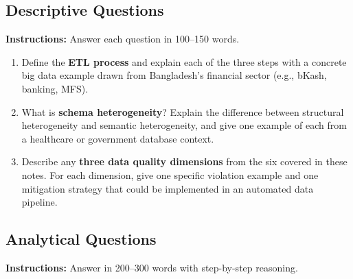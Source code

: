 \documentclass[12pt,a4paper]{article}
\begin{document}
\subsection*{Descriptive Questions}
\noindent\textbf{Instructions:} Answer each question in 100--150 words.

\begin{enumerate}[label=\textbf{D\arabic*.}, leftmargin=2.5em, itemsep=8pt]
  \item Define the \textbf{ETL process} and explain each of the three steps with a concrete big data example drawn from Bangladesh's financial sector (e.g., bKash, banking, MFS).
  \item What is \textbf{schema heterogeneity}?  Explain the difference between structural heterogeneity and semantic heterogeneity, and give one example of each from a healthcare or government database context.
  \item Describe any \textbf{three data quality dimensions} from the six covered in these notes.  For each dimension, give one specific violation example and one mitigation strategy that could be implemented in an automated data pipeline.
\end{enumerate}

\subsection*{Analytical Questions}
\noindent\textbf{Instructions:} Answer in 200--300 words with step-by-step reasoning.
\end{document}
